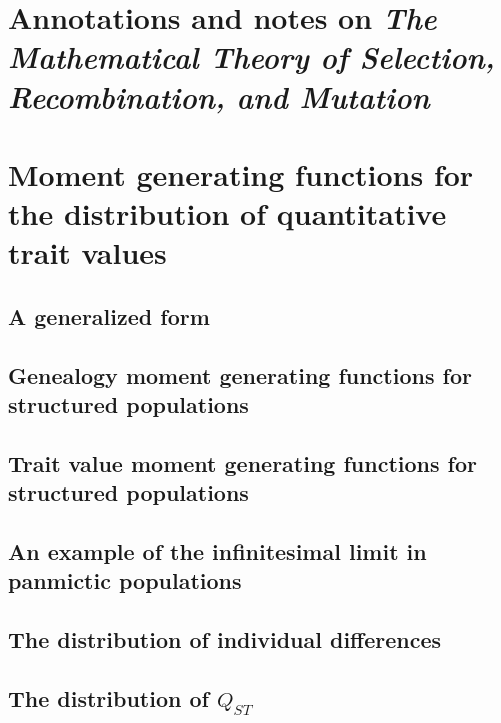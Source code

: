 \documentclass{article}
\begin{document}
\section{Annotations and notes on \emph{The Mathematical Theory of Selection, Recombination, and Mutation} \citep{burger2000mathematical}}
\subsection{\citet[chap. 4]{burger2000mathematical}}


\section{Moment generating functions for the distribution of quantitative trait values}
\subsection{A generalized form}

\subsection{Genealogy moment generating functions for structured populations}

\subsection{Trait value moment generating functions for structured populations}

\subsection{An example of the infinitesimal limit in panmictic populations}

\subsection{The distribution of individual differences}

\subsection{The distribution of $Q_{ST}$}


\clearpage


\end{document}
